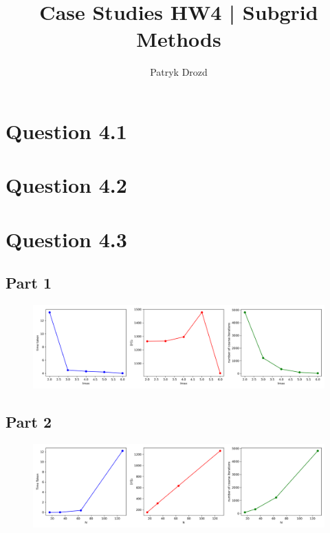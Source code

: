 \documentclass[a4paper]{article}
\title{Case Studies HW4 | Subgrid Methods}
\author{Patryk Drozd}
\begin{document}
\date{}
\maketitle

\section*{Question 4.1}
\section*{Question 4.2}
\section*{Question 4.3}

\subsection*{Part 1}
%

	\begin{figure}[h!]
	    \centering
    	\includegraphics[width=1\linewidth]{./q3_part1.png}
	\end{figure}

\subsection*{Part 2}
%


	\begin{figure}[h!]
	    \centering
    	\includegraphics[width=1\linewidth]{./q3_part2.png}
	\end{figure}


 
 
\end{document}
